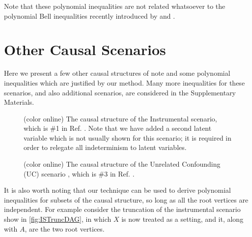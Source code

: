 Note that these polynomial inequalities are not related whatsoever to the polynomial Bell inequalities recently introduced by \citet{ChavesPolynomial} and \citet{RossetNetworks}.





\section{Other Causal Scenarios}
Here we present a few other causal structures of note and some polynomial inequalities which are justified by our method. Many more inequalities for these scenarios, and also additional scenarios, are considered in the Supplementary Materials.

\begin{figure}[t]
\caption{(color online) The causal structure of the Instrumental scenario, which is \#1 in Ref. \cite{pusey2014gdag}. Note that we have added a second latent variable which is not usually shown for this scenario; it is required in order to relegate all indeterminism to latent variables.}
 \label{fig:InstrumentalDAG}
\end{figure}
\newpage\begin{figure}[b]
\caption{(color online) The causal structure of the Unrelated Confounding (UC) scenario \cite{evans2012graphical}, which is \#3 in Ref. \cite{pusey2014gdag}.}
 \label{fig:EvansDAG}
\end{figure}

It is also worth noting that our technique can be used to derive polynomial inequalities for subsets of the causal structure, so long as all the root vertices are independent. For example consider the truncation of the instrumental scenario show in \cref{fig:ISTruncDAG}, in which $X$ is now treated as a setting, and it, along with $A$, are the two root vertices. 

